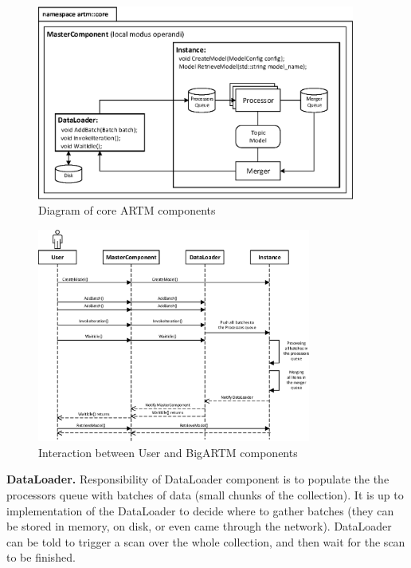\documentclass[11pt,a4paper,twoside]{report}
\begin{document}
\begin{figure}[h!]
\begin{centering}
\includegraphics[height=64mm]{diagramm_artm_core.eps}
\caption{Diagram of core ARTM components}
\label{fig:diagramm_artm_core}
\end{centering}
\end{figure}
\vspace{1ex}

\begin{figure}[h!]
\begin{centering}
\includegraphics[width=90mm]{diagramm_workflow.eps}
\caption{Interaction between User and BigARTM components}
\label{fig:diagramm_workflow}
\end{centering}
\end{figure}

\textbf{DataLoader.} Responsibility of DataLoader component is to populate the the processors queue
with batches of data (small chunks of the collection).
It is up to implementation of the DataLoader to decide where to gather batches
(they can be stored in memory, on disk, or even came through the network).
DataLoader can be told to trigger a scan over the whole collection,
and then wait for the scan to be finished.
\end{document}
